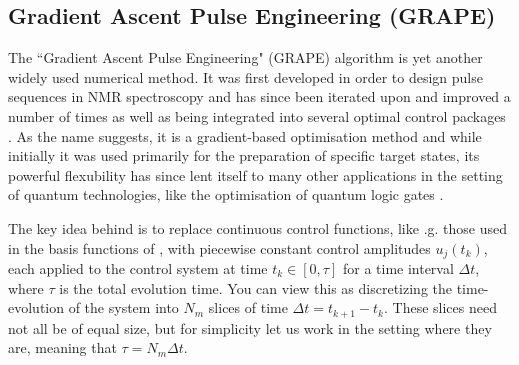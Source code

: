 \subsection{Gradient Ascent Pulse Engineering (GRAPE)}\label{sec:3.3.2_GRAPE}

The ``Gradient Ascent Pulse Engineering" (GRAPE) algorithm is yet another widely used  numerical method. It was first developed in order to design pulse sequences in NMR spectroscopy \cite{khaneja_optimal_2005} and has since been iterated upon and improved a number of times as well as being integrated into several optimal control packages \cite{de_fouquieres_second_2011, chen_iterative_2022, machnes_comparing_2011, johansson_qutip_2013}. As the name suggests, it is a gradient-based optimisation method and while initially it was used primarily for the preparation of specific target states, its powerful flexubility has since lent itself to many other applications in the setting of quantum technologies, like the optimisation of quantum logic gates \cite{motzoi_optimal_2011, anderson_accurate_2015}.

The key idea behind  is to replace continuous control functions, like \@e.g. those used in the basis functions of , with piecewise constant control amplitudes $u_j(t_k)$, each applied to the control system at time $t_k \in [0, \tau]$ for a time interval $\Delta t$, where $\tau$ is the total evolution time. You can view this as discretizing the time-evolution of the system into $N_m$ slices of time $\Delta t = t_{k + 1} - t_k$. These slices need not all be of equal size, but for simplicity let us work in the setting where they are, meaning that $\tau = N_m \Delta t$.

